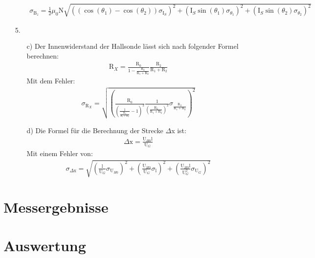 \documentclass[12pt]{scrartcl}
\begin{document}
\begin{enumerate}
\begin{enumerate}
\begin{align}
\sigma_{\text{B}_z} = \frac{1}{2} \mu_0 \text{N}
\sqrt{\left((\cos(\theta_1) - \cos(\theta_2)) \sigma_{\text{I}_S}\right)^2+
\left(\text{I}_S \sin(\theta_1) \sigma_{\theta_1}\right)^2+
\left(\text{I}_S \sin(\theta_2) \sigma_{\theta_2}\right)^2}
\label{eqn:aufgabe_3_sigma}
\end{align}
\end{enumerate}
\item[5.]
\begin{enumerate}
\item[c)] Der Innenwiderstand der Hallsonde lässt sich nach folgender Formel berechnen:
\begin{align}
\text{R}_X = \frac{\text{R}_0}{1-\frac{\text{R}_2}{\text{R}_1+\text{R}_2}}\frac{\text{R}_2}{\text{R}_1+\text{R}_2}
\label{eqn:innen_widerstand}
\end{align}
Mit dem Fehler:
\begin{align}
\sigma_{\text{R}_X} = \sqrt{\left(\frac{\text{R}_0}{\left(\frac{1}{\frac{\text{R}_2}{\text{R}_1+\text{R}_2}}-1\right)^2}\frac{1}{\left(\frac{\text{R}_2}{\text{R}_1+
\text{R}_2}\right)^2}\sigma_{\frac{\text{R}_2}{\text{R}_1+\text{R}_2}}\right)^2}
\label{eqn:innen_widerstand_sigma}
\end{align}

\item[d)]
Die Formel für die Berechnung der Strecke $\Delta$x ist:
\begin{align}
\Delta \text{x} = \frac{\text{U}_{H0}\text{l}}{\text{U}_G}
\label{eqn:delta}
\end{align}
Mit einem Fehler von:
\begin{align}
\sigma_{\Delta \text{x}} = \sqrt{
\left(\frac{\text{l}}{\text{U}_G}\sigma_{\text{U}_{H0}}\right)^2+
\left(\frac{\text{U}_{H0}}{\text{U}_G}\sigma_{\text{l}}\right)^2+
\left(\frac{\text{U}_{H0}\text{l}}{\text{U}_G^2}\sigma_{\text{U}_G}\right)^2}
\label{eqn:delta_sigma}
\end{align}
\end{enumerate}

\end{enumerate}

\section{Messergebnisse}


\section{Auswertung}
\end{document}

